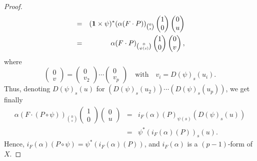 \documentclass[11pt,reqno]{amsart}
\theoremstyle{definition}
\newcommand{\qmbox}[1]{\quad \mbox{#1}\quad}
\def \D{{D}}
\def \F{{F}}
\def \P{{P}}
\def \X{{X}}
\newcommand{\id}{{\bf 1}}
\begin{document}
\begin{proof}
\begin{eqnarray*}
      & = & (\id\times\psi)^*(\alpha(\F \cdot \P)) _{0 \choose s} 
      \begin{pmatrix}1 \\ 0\end{pmatrix} \begin{pmatrix}0 \\ u\end{pmatrix} \\ 
      & = & \alpha(\F \cdot \P)_{0 \choose \psi(s)} 
      \begin{pmatrix}1 \\ 0\end{pmatrix} \begin{pmatrix}0 \\ v\end{pmatrix},
    \end{eqnarray*}
    where
    $$
      \begin{pmatrix}0 \\ v\end{pmatrix} = \begin{pmatrix}0 \\ v_2\end{pmatrix} \cdots
      \begin{pmatrix}0 \\ v_{p}\end{pmatrix} \qmbox{with} v_i = \D(\psi)_s(u_i).
      $$
    Thus, denoting $\D(\psi)_s(u)$ for
    $(\D(\psi)_s(u_2)) \cdots (\D(\psi)_s(u_{p}))$, we get finally
    \begin{eqnarray*}
      \alpha(\F \cdot
      (\P \circ \psi))_{0 \choose s} \begin{pmatrix}1 \\ 0\end{pmatrix}
      \begin{pmatrix}0 \\ u\end{pmatrix}
      & = & i_\F(\alpha)(\P)_{\psi(s)}(\D(\psi)_s(u)) \\
      & = & \psi^*(i_\F(\alpha)(\P))_s(u). 
    \end{eqnarray*}
    Hence, $i_\F(\alpha)(\P \circ \psi) =
      \psi^*(i_\F(\alpha)(\P))$, and $i_\F(\alpha)$ is a
    $(p-1)$-form of $\X$. 
    

\end{proof}
\end{document}
